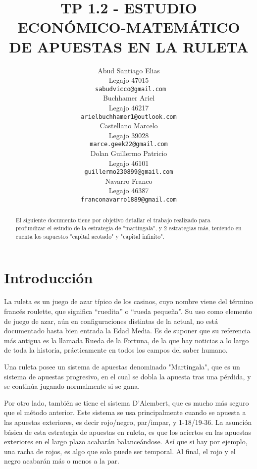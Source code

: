 \documentclass{article}
\title{TP 1.2 - ESTUDIO ECONÓMICO-MATEMÁTICO DE APUESTAS EN LA RULETA}
\author{
    Abud Santiago Elias \\
    Legajo 47015 \\
    \texttt{ sabudvicco@gmail.com} \\
    \And
    Buchhamer Ariel \\
    Legajo 46217\\
    \texttt{arielbuchhamer1@outlook.com} \\
    \And
    Castellano Marcelo \\
    Legajo 39028 \\
    \texttt{marce.geek22@gmail.com} \\
    \And
    Dolan Guillermo Patricio \\
    Legajo 46101\\
    \texttt{guillermo230899@gmail.com} \\
    \And
    Navarro Franco \\
    Legajo 46387 \\
    \texttt{franconavarro1889@gmail.com} \\
}
\begin{document}
    \maketitle
    \begin{abstract}
        El siguiente documento tiene por objetivo detallar el trabajo realizado para
        profundizar el estudio de la estrategia de "martingala", y 2 estrategias más, teniendo en cuenta los supuestos "capital acotado"
        y "capital infinito".
    \end{abstract}






    \section{Introducción}
    La ruleta es un juego de azar típico de los casinos, cuyo nombre viene del término francés roulette,
    que significa ``ruedita'' o ``rueda pequeña''. Su uso como elemento de juego de azar, aún
    en configuraciones distintas de la actual, no está documentado hasta bien entrada la Edad Media.
    Es de suponer que su referencia más antigua es la llamada Rueda de la Fortuna, de la que hay
    noticias a lo largo de toda la historia, prácticamente en todos los campos del saber humano.

    Una ruleta posee un sistema de apuestas denominado "Martingala", que es un sistema de apuestas progresivo,
    en el cual se dobla la apuesta tras una pérdida, y se continúa jugando normalmente si se gana.

    Por otro lado, también se tiene el sistema D'Alembert, que es mucho más seguro que el método anterior.
    Este sistema se usa principalmente cuando se apuesta a las apuestas exteriores,
    es decir rojo/negro, par/impar, y 1-18/19-36. La asunción básica de esta estrategia de apuestas en ruleta,
    es que los aciertos en las apuestas exteriores en el largo plazo acabarán balanceándose.
    Así que si hay por ejemplo, una racha de rojos, es algo que solo puede ser temporal.
    Al final, el rojo y el negro acabarán más o menos a la par.
\end{document}
